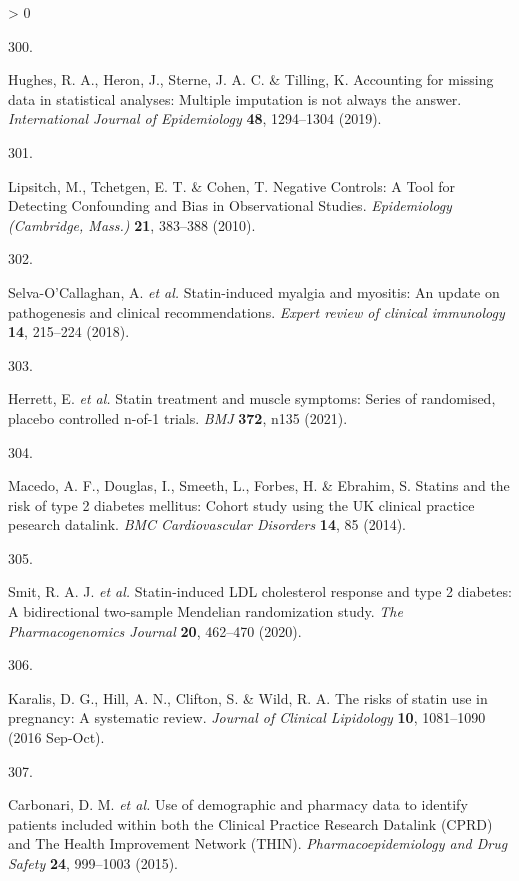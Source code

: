 \documentclass[a4paper, twoside]{templates/ociamthesis}
\newlength{\cslhangindent}
\newlength{\csllabelwidth}
\newenvironment{CSLReferences}[3] %
 {%
  \setlength{\parindent}{0pt}
  \ifodd #1 \everypar{\setlength{\hangindent}{\cslhangindent}}\ignorespaces\fi
  \ifnum #2 > 0
  \setlength{\parskip}{#2\baselineskip}
  \fi
 }%
 {}
\newcommand{\CSLLeftMargin}[1]{\parbox[t]{\maxof{\widthof{#1}}{\csllabelwidth}}{#1}}
\newcommand{\CSLRightInline}[1]{\parbox[t]{\linewidth - \csllabelwidth}{#1}}
\begin{document}
\begin{CSLReferences}{0}{0}
\leavevmode\hypertarget{ref-hughes2019}{}%
\CSLLeftMargin{300. }
\CSLRightInline{Hughes, R. A., Heron, J., Sterne, J. A. C. \& Tilling, K. Accounting for missing data in statistical analyses: Multiple imputation is not always the answer. \emph{International Journal of Epidemiology} \textbf{48}, 1294--1304 (2019).}

\leavevmode\hypertarget{ref-lipsitch2010}{}%
\CSLLeftMargin{301. }
\CSLRightInline{Lipsitch, M., Tchetgen, E. T. \& Cohen, T. Negative {Controls}: A {Tool} for {Detecting Confounding} and {Bias} in {Observational Studies}. \emph{Epidemiology (Cambridge, Mass.)} \textbf{21}, 383--388 (2010).}

\leavevmode\hypertarget{ref-selva-ocallaghan2018}{}%
\CSLLeftMargin{302. }
\CSLRightInline{Selva-O'Callaghan, A. \emph{et al.} Statin-induced myalgia and myositis: An update on pathogenesis and clinical recommendations. \emph{Expert review of clinical immunology} \textbf{14}, 215--224 (2018).}

\leavevmode\hypertarget{ref-herrett2021}{}%
\CSLLeftMargin{303. }
\CSLRightInline{Herrett, E. \emph{et al.} Statin treatment and muscle symptoms: Series of randomised, placebo controlled n-of-1 trials. \emph{BMJ} \textbf{372}, n135 (2021).}

\leavevmode\hypertarget{ref-macedo2014}{}%
\CSLLeftMargin{304. }
\CSLRightInline{Macedo, A. F., Douglas, I., Smeeth, L., Forbes, H. \& Ebrahim, S. Statins and the risk of type 2 diabetes mellitus: Cohort study using the {UK} clinical practice pesearch datalink. \emph{BMC Cardiovascular Disorders} \textbf{14}, 85 (2014).}

\leavevmode\hypertarget{ref-smit2020}{}%
\CSLLeftMargin{305. }
\CSLRightInline{Smit, R. A. J. \emph{et al.} Statin-induced {LDL} cholesterol response and type 2 diabetes: A bidirectional two-sample {Mendelian} randomization study. \emph{The Pharmacogenomics Journal} \textbf{20}, 462--470 (2020).}

\leavevmode\hypertarget{ref-karalis2016}{}%
\CSLLeftMargin{306. }
\CSLRightInline{Karalis, D. G., Hill, A. N., Clifton, S. \& Wild, R. A. The risks of statin use in pregnancy: A systematic review. \emph{Journal of Clinical Lipidology} \textbf{10}, 1081--1090 (2016 Sep-Oct).}

\leavevmode\hypertarget{ref-carbonari2015}{}%
\CSLLeftMargin{307. }
\CSLRightInline{Carbonari, D. M. \emph{et al.} Use of demographic and pharmacy data to identify patients included within both the {Clinical Practice Research Datalink} ({CPRD}) and {The Health Improvement Network} ({THIN}). \emph{Pharmacoepidemiology and Drug Safety} \textbf{24}, 999--1003 (2015).}


\end{CSLReferences}
\end{document}
